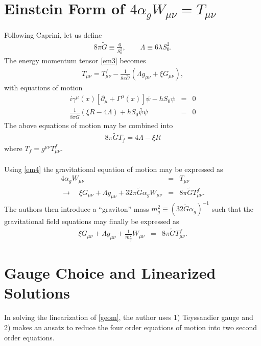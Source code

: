 \documentclass[10pt,letterpaper]{article}
\numberwithin{equation}{subsection}
\begin{document}
\section{Einstein Form of $4\alpha_g W_{\mu\nu} = T_{\mu\nu}$}
Following Caprini, let us define
\begin{eqnarray}
8\pi\tilde G \equiv \frac{6}{S_0^2},\qquad \Lambda \equiv 6\lambda S_0^2.
\end{eqnarray}
The energy momentum tensor \eqref{em3} becomes
\begin{eqnarray}
 T_{\mu\nu} = T_{\mu\nu}^f  - \frac{1}{8\pi\tilde G} \left( \Lambda g_{\mu\nu} + \xi G_{\mu\nu} \right),
\label{em4}
\end{eqnarray}
with equations of motion
\begin{eqnarray}
i\gamma^\mu(x)[\partial_\mu + \Gamma^\mu(x)]\psi - hS_0\psi &=& 0
\\
\label{psieom3}
\frac{1}{8\pi\tilde G} ( \xi R-4\Lambda ) + hS_0 \bar\psi\psi &=& 0
\label{seom3}
\end{eqnarray}
The above equations of motion may be combined into
\begin{eqnarray}
8\pi \tilde GT_f = 4\Lambda -\xi R
\label{sphieom4}
\end{eqnarray}
where $T_f = g^{\mu\nu}T_{\mu\nu}^f$. 
\\ \\
Using \eqref{em4} the gravitational equation of motion may be expressed as
\begin{eqnarray}
4\alpha_g W_{\mu\nu} &=&T_{\mu\nu}
\nonumber\\
\to\quad \xi G_{\mu\nu} +\Lambda g_{\mu\nu}+ 32\pi\tilde G \alpha_g W_{\mu\nu} 
&=& 8\pi\tilde G T_{\mu\nu}^f.
\end{eqnarray}
The authors then introduce a ``graviton'' mass $m_g^2 \equiv (32\tilde G\alpha_g)^{-1}$ such that the gravitational field equations may finally be expressed as
\begin{eqnarray}
\xi G_{\mu\nu} +\Lambda g_{\mu\nu}+  \frac{1}{m_g^2} W_{\mu\nu} 
&=& 8\pi\tilde G T_{\mu\nu}^f.
\label{geom}
\end{eqnarray}

\section{Gauge Choice and Linearized Solutions}
In solving the linearization of \eqref{geom}, the author uses 1) Teyssandier gauge and 2) makes an ansatz to reduce the four order equations of motion into two second order equations. 
\end{document}
